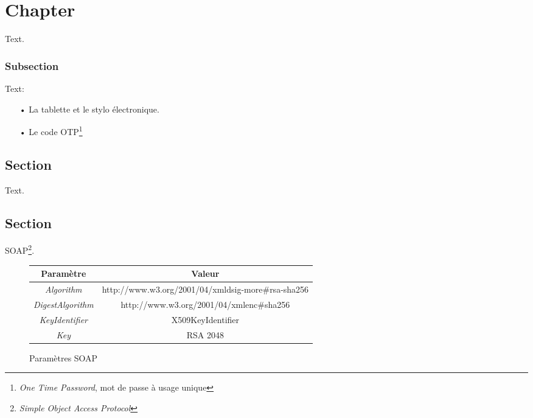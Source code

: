 \chapter{Chapter}

Text. 

\newpage
\subsection{Subsection}

Text:\\

\begin{itemize}
	\item[•]La tablette et le stylo électronique.
	\item[•]Le code OTP\footnote{\textit{One Time Password}, mot de passe à usage unique} 
\end{itemize}

\section{Section}

Text.

\newpage

\section{Section}

SOAP\footnote{\textit{Simple Object Access Protocol}}. \\

{\renewcommand{\arraystretch}{1.3}
\begin{figure}
	\begin{tabular}{|c|c|}
		\hline
			\rowcolor{darkblue}
			\color{white}Paramètre & \color{white}Valeur \\
		\hline
			\textit{Algorithm} & http://www.w3.org/2001/04/xmldsig-more\#rsa-sha256 \\
		\hline
			\textit{DigestAlgorithm} & http://www.w3.org/2001/04/xmlenc\#sha256 \\
		\hline
			\textit{KeyIdentifier} & X509KeyIdentifier \\
		\hline
			\textit{Key} & RSA 2048 \\
		\hline
	\end{tabular}
	\caption{Paramètres SOAP}
\end{figure}}
